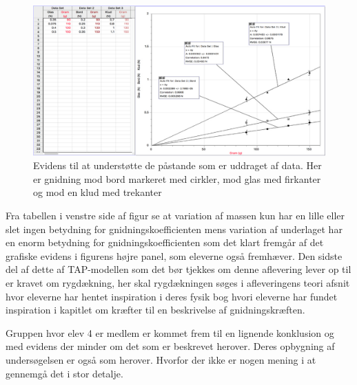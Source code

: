 \begin{figure}[h!]
	\centering
	\includegraphics[width=\textwidth]{Figs/EviAlm}
	\caption{Evidens til at understøtte de påstande som er uddraget af data. Her er gnidning mod bord markeret med cirkler, mod glas med firkanter og mod en klud med trekanter}
	\label{fig:evidens.alma}
\end{figure}

Fra tabellen i venstre side af figur  se at variation af massen kun har en lille eller slet ingen betydning for gnidningskoefficienten mens variation af underlaget har en enorm betydning for gnidningskoefficienten som det klart fremgår af det grafiske evidens i figurens højre panel, som eleverne også fremhæver. 
Den sidste del af dette af TAP-modellen som det bør tjekkes om denne aflevering lever op til er kravet om rygdækning, her skal rygdækningen søges i afleveringens teori afsnit hvor eleverne har hentet inspiration i deres fysik bog \citep[FysikABbogen 1]{Benoni2010} hvori eleverne har fundet inspiration i kapitlet om kræfter til en beskrivelse af gnidningskræften.

Gruppen hvor elev 4 er medlem er kommet frem til en lignende konklusion og med evidens der minder om det som er beskrevet herover. Deres opbygning af undersøgelsen er også som herover. Hvorfor der ikke er nogen mening i at gennemgå det i stor detalje. 

